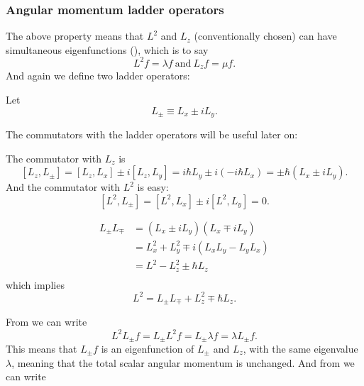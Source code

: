 \subsubsection{Angular momentum ladder operators}
The above property means that $L^2$ and $L_z$ (conventionally chosen) can have 
simultaneous eigenfunctions (), which is to say
\begin{equation}
L^2f=\lambda f\ \text{and}\ L_zf=\mu f. 
\end{equation}
And again we define two ladder operators: 
\begin{defi}
Let
\begin{equation}
L_{\pm}\equiv L_x\pm iL_y.
\end{equation}
\end{defi}
The commutators with the ladder operators will be useful later on:
\begin{prt}
The commutator with $L_z$ is 
\begin{equation}
\label{lzlpm}
[L_z,L_{\pm}]=[L_z,L_x]\pm i[L_z,L_y]=i\hbar L_y\pm i(-i\hbar L_x)=\pm\hbar(L_x\pm iL_y).
\end{equation}
And the commutator with $L^2$ is easy:
\begin{equation}
\label{l2lpm}
[L^2,L_{\pm}]=[L^2,L_x]\pm i[L^2,L_y]=0.
\end{equation}
\end{prt}
\begin{prt}
\label{lpmmp}
\begin{equation}
\begin{aligned}
L_{\pm}L_{\mp}&=(L_x\pm iL_y)(L_x\mp iL_y)\\
&=L_x^2+L_y^2\mp i(L_xL_y-L_yL_x)\\
&=L^2-L^2_z\pm \hbar L_z\\
\end{aligned}
\end{equation}
which implies
\begin{equation}
L^2=L_{\pm}L_{\mp}+L^2_z\mp\hbar L_z. 
\end{equation}
\end{prt}
From  we can write
\begin{equation}
\label{l2ladder}
L^2L_{\pm}f=L_{\pm}L^2f=L_{\pm}\lambda f=\lambda L_{\pm}f.
\end{equation}
This means that $L_{\pm}f$ is an eigenfunction of $L_{\pm}$ and $L_z$, with 
the same eigenvalue $\lambda$, meaning that the 
total scalar angular momentum is unchanged. And from  we can write 
